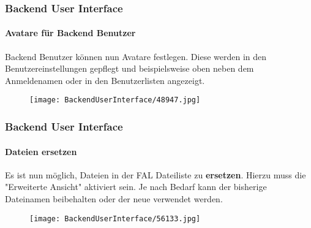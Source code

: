 %
\begin{frame}[fragile]
	\frametitle{Backend User Interface}
	\framesubtitle{Avatare für Backend Benutzer}

	Backend Benutzer können nun Avatare festlegen.
	Diese werden in den Benutzereinstellungen gepflegt und beispielsweise oben neben dem Anmeldenamen
	oder in den Benutzerlisten angezeigt.

	\begin{figure}
		\texttt{[image: BackendUserInterface/48947.jpg]}
	\end{figure}

\end{frame}

\begin{frame}[fragile]
	\frametitle{Backend User Interface}
	\framesubtitle{Dateien ersetzen}

	Es ist nun möglich, Dateien in der FAL Dateiliste zu \textbf{ersetzen}.
	Hierzu muss die "Erweiterte Ansicht" aktiviert sein.
	Je nach Bedarf kann der bisherige Dateinamen beibehalten oder der neue verwendet werden.

	\begin{figure}
		\texttt{[image: BackendUserInterface/56133.jpg]}
	\end{figure}

\end{frame}

